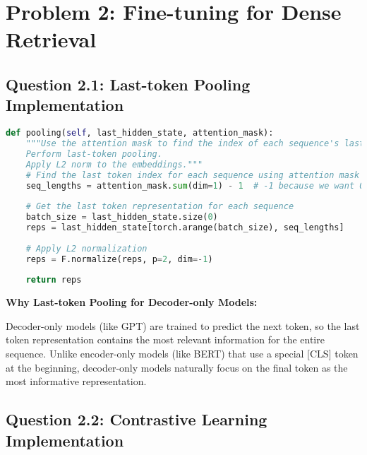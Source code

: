 \documentclass[11pt]{article}
\begin{document}
\section{Problem 2: Fine-tuning for Dense Retrieval}

\subsection{Question 2.1: Last-token Pooling Implementation}

\begin{lstlisting}[language=Python]
def pooling(self, last_hidden_state, attention_mask):
    """Use the attention mask to find the index of each sequence's last token;
    Perform last-token pooling.
    Apply L2 norm to the embeddings."""
    # Find the last token index for each sequence using attention mask
    seq_lengths = attention_mask.sum(dim=1) - 1  # -1 because we want 0-indexed position
    
    # Get the last token representation for each sequence
    batch_size = last_hidden_state.size(0)
    reps = last_hidden_state[torch.arange(batch_size), seq_lengths]
    
    # Apply L2 normalization
    reps = F.normalize(reps, p=2, dim=-1)
    
    return reps
\end{lstlisting}

\textbf{Why Last-token Pooling for Decoder-only Models:}

Decoder-only models (like GPT) are trained to predict the next token, so the last token representation contains the most relevant information for the entire sequence. Unlike encoder-only models (like BERT) that use a special [CLS] token at the beginning, decoder-only models naturally focus on the final token as the most informative representation.

\subsection{Question 2.2: Contrastive Learning Implementation}
\end{document}
